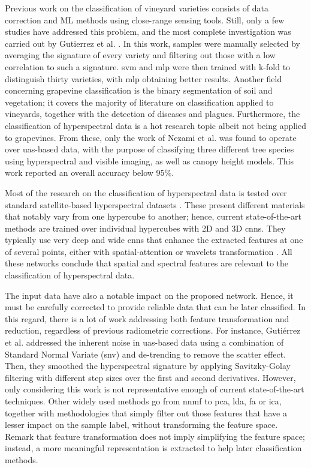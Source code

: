 Previous work on the classification of vineyard varieties consists of data correction and ML methods using close-range sensing tools. Still, only a few studies have addressed this problem, and the most complete investigation was carried out by Gutierrez et al. \cite{gutierrez_--go_2018}. In this work, samples were manually selected by averaging the signature of every variety and filtering out those with a low correlation to such a signature. \acrshort{svm} and \acrshort{mlp} were then trained with k-fold to distinguish thirty varieties, with \acrshort{mlp} obtaining better results. Another field concerning grapevine classification is the binary segmentation of soil and vegetation; it covers the majority of literature on classification applied to vineyards, together with the detection of diseases and plagues. Furthermore, the classification of hyperspectral data is a hot research topic albeit not being applied to grapevines. From these, only the work of Nezami et al. \cite{nezami_tree_2020} was found to operate over \acrshort{uas}-based data, with the purpose of classifying three different tree species using hyperspectral and visible imaging, as well as canopy height models. This work reported an overall accuracy below 95\%.

Most of the research on the classification of hyperspectral data is tested over standard satellite-based hyperspectral datasets \cite{m_grana_hyperspectral_nodate}. These present different materials that notably vary from one hypercube to another; hence, current state-of-the-art methods are trained over individual hypercubes with 2D and 3D \acrshort{cnn}s. They typically use very deep and wide \acrshort{cnn}s \cite{moraga_jigsawhsi_2022} that enhance the extracted features at one of several points, either with spatial-attention \cite{xue_attention-based_2021, roy_attention-based_2021} or wavelets transformation \cite{chakraborty_spectralnet_2021}. All these networks conclude that spatial and spectral features are relevant to the classification of hyperspectral data.

The input data have also a notable impact on the proposed network. Hence, it must be carefully corrected to provide reliable data that can be later classified. In this regard, there is a lot of work addressing both feature transformation and reduction, regardless of previous radiometric corrections. For instance, Gutiérrez et al. \cite{gutierrez_--go_2018} addressed the inherent noise in \acrshort{uas}-based data using a combination of Standard Normal Variate (\acrshort{snv}) and de-trending to remove the scatter effect. Then, they smoothed the hyperspectral signature by applying Savitzky-Golay filtering with different step sizes over the first and second derivatives. However, only considering this work is not representative enough of current state-of-the-art techniques. Other widely used methods go from \acrshort{nnmf} to \acrshort{pca}, \acrshort{lda}, \acrshort{fa} or \acrshort{ica}, together with methodologies that simply filter out those features that have a lesser impact on the sample label, without transforming the feature space. Remark that feature transformation does not imply simplifying the feature space; instead, a more meaningful representation is extracted to help later classification methods. 

